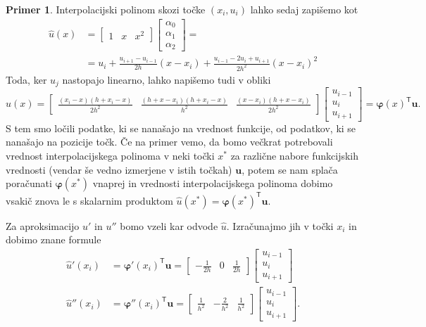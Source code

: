\documentclass[12pt,a4paper]{article}
\theoremstyle{definition} %
\newtheorem{primer}[definicija]{Primer}
\theoremstyle{plain} %
\newcommand{\T}{\mathsf{T}}
\renewcommand{\b}{\boldsymbol}
\renewcommand{\phi}{\varphi}
\begin{document}
\begin{primer}
Interpolacijski polinom skozi točke $(x_i, u_i)$ lahko sedaj zapišemo kot
\begin{align*}
  \hat{u}(x) &=
  \begin{bmatrix}
    1 & x & x^2
  \end{bmatrix}
  \begin{bmatrix}
    \alpha_0 \\ \alpha_1 \\ \alpha_2
  \end{bmatrix} = \\
  &= u_i +\frac{u_{i+1}-u_{i-1}}{2 h}(x-x_i)+\frac{u_{i-1}-2 u_{i}+u_{i+1}}{2 h^2}(x-x_i)^2
\end{align*}
Toda, ker $u_j$ nastopajo linearno, lahko napišemo tudi v obliki
\[
  \hat{u}(x) =
  \begin{bmatrix}
  \frac{(x_i-x) (h+x_i-x)}{2 h^2} & \frac{(h+x-x_i)(h+x_i-x)}{h^2} & \frac{(x-x_i) (h+x-x_i)}{2 h^2}
  \end{bmatrix}
  \begin{bmatrix}
    u_{i-1} \\ u_{i} \\ u_{i+1}
  \end{bmatrix}= \b\phi(x)^\T\b u.
\]
S tem smo ločili podatke, ki se nanašajo na vrednost funkcije, od podatkov, ki
se nanašajo na pozicije točk. Če na primer vemo, da bomo večkrat potrebovali
vrednost interpolacijskega polinoma v neki točki $x^\ast$ za različne nabore
funkcijskih vrednosti (vendar še vedno izmerjene v istih točkah) $\b u$, potem
se nam splača poračunati $\b\phi(x^\ast)$ vnaprej in vrednosti
interpolacijskega polinoma dobimo vsakič znova le s skalarnim produktom $\hat
u(x^\ast) = \b\phi(x^\ast) ^\T \b u$.

Za aproksimacijo $u'$ in $u''$ bomo vzeli kar odvode $\hat{u}$. Izračunajmo
jih v točki $x_i$ in dobimo znane formule
\begin{align*}
  \hat u'(x_i) &= \b\phi'(x_i)^\T \b u =
  \begin{bmatrix}
    -\frac{1}{2h} & 0 & \frac{1}{2h}
  \end{bmatrix} \begin{bmatrix}
    u_{i-1} \\ u_{i} \\ u_{i+1}
  \end{bmatrix}\\
  \hat u''(x_i) &= \b\phi''(x_i)^\T \b u =
  \begin{bmatrix}
    \frac{1}{h^2} & -\frac{2}{h^2} & \frac{1}{h^2}
  \end{bmatrix}\begin{bmatrix}
    u_{i-1} \\ u_{i} \\ u_{i+1}
  \end{bmatrix}.
\end{align*}


\end{primer}
\end{document}
